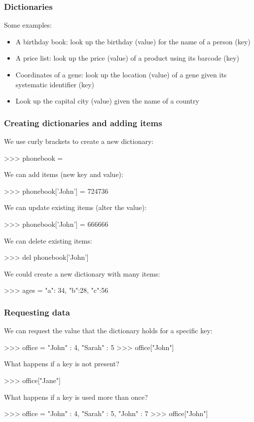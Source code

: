 \documentclass{beamer}
\begin{document}
\begin{frame}[fragile]
\frametitle{Dictionaries}
Some examples:
\begin{itemize}
\item A birthday book: look up the birthday (value) for the
name of a person (key)
\item A price list: look up the price (value) of a product
using its barcode (key)
\item Coordinates of a gene: look up the location (value)
of a gene given its systematic identifier (key)
\item Look up the capital city (value) given the name of a
country
\end{itemize}
\end{frame}

\begin{frame}[fragile]
\frametitle{Creating dictionaries and adding items}
We use curly brackets to create a new dictionary:
\begin{code}
>>> phonebook = {}
\end{code}

We can add items (new key and value):
\begin{code}
>>> phonebook['John'] = 724736
\end{code}

We can update existing items (alter the value):
\begin{code}
>>> phonebook['John'] = 666666
\end{code}

We can delete existing items:
\begin{code}
>>> del phonebook['John']
\end{code}

We could create a new dictionary with many items:
\begin{code}
>>> ages = { "a": 34, "b":28, "c":56 }
\end{code}
\end{frame}

\begin{frame}[fragile]
\frametitle{Requesting data}
We can request the value that the dictionary holds for a specific
key:
\begin{code}
>>> office = { "John" : 4, "Sarah" : 5 }
>>> office["John"]
\end{code}
 What happens if a key is not present?
\begin{code}
>>> office["Jane"]
\end{code}
 What happens if a key is used more than once?
\begin{code}
>>> office = { "John" : 4, "Sarah" : 5, "John" : 7 }
>>> office["John"]
\end{code}
\end{frame}
\end{document}
